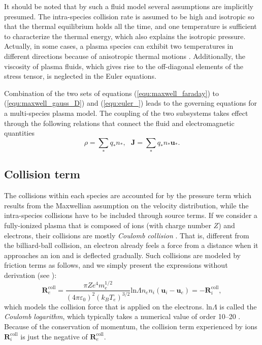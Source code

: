 \documentclass{report}
\begin{document}
It should be noted that by such a fluid model several assumptions are implicitly presumed. The intra-species collision rate is assumed to be high and isotropic so that the thermal equilibrium holds all the time, and one temperature is sufficient to characterize the thermal energy, which also explains the isotropic pressure. Actually, in some cases, a plasma species can exhibit two temperatures in different directions because of anisotropic thermal motions \citep{chen2016}. Additionally, the viscosity of plasma fluids, which gives rise to the off-diagonal elements of the stress tensor, is neglected in the Euler equations. 

Combination of the two sets of equations (\ref{equ:maxwell_faraday}) to (\ref{equ:maxwell_gauss_D}) and (\ref{equ:euler_}) leads to the governing equations for a multi-species plasma model. The coupling of the two subsystems takes effect through the following relations that connect the fluid and electromagnetic quantities
\begin{equation*}
    \rho = \sum_* q_*n_*, \ \ \  \mathbf{J} = \sum_* q_*n_*\mathbf{u}_*. 
\end{equation*}
\subsection{Collision term}
The collisions within each species are accounted for by the pressure term which results from the Maxwellian assumption on the velocity distribution, while the intra-species collisions have to be included through source terms. If we consider a fully-ionized plasma that is composed of ions (with charge number $Z$) and electrons, their collisions are mostly \emph{Coulomb collision} \citep[][sec. 5.6.2]{chen2016}. That is, different from the billiard-ball collision, an electron already feels a force from a distance when it approaches an ion and is deflected gradually. Such collisions are modeled by friction terms as follows, and we simply present the expressions without derivation (see \citep[][sec. 5.6.2]{chen2016}):
\begin{equation} \label{equ:collision}
    \mathbf{R}_{e}^{\text{coll}} = \frac{\pi Ze^4m_e^{1/2}}{(4\pi\varepsilon_0)^2(k_BT_e)^{3/2}}\text{ln}\Lambda n_en_i(\mathbf{u}_i - \mathbf{u}_e) = - \mathbf{R}_{i}^{\text{coll}},  
\end{equation}
which models the collision force that is applied on the electrons. ln$\Lambda$ is called the \emph{Coulomb logarithm}, which typically takes a numerical value of order 10–20 . Because of the conservation of momentum, the collision term experienced by ions $\mathbf{R}_{i}^{\text{coll}}$ is just the negative of $\mathbf{R}_{e}^{\text{coll}}$.
\end{document}
